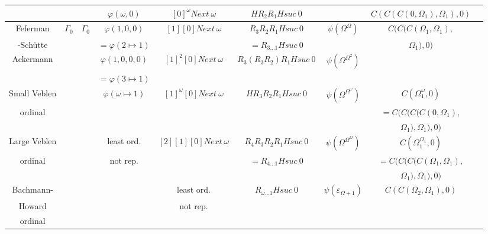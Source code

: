 \documentclass[10pt]{article}
\begin{document}
\begin{tabular}{|c|c|c|c|c|c|c|c|c|}
		&			&			& \(\varphi(\omega,0)\)		& \([0]^\omega Next\ \omega\) & \(H R_2 R_1 H suc\ 0\)&					& \(C(C(C(0,\Omega_1),\Omega_1),0)\) \\ \hline
Feferman	& \(\Gamma_0\)		
								& \(\Gamma_0\)			& \(\varphi(1,0,0)\)		& \([1] [0] Next\ \omega\)	& \(R_3 R_2 R_1 H suc\ 0\) & \(\psi(\Omega^\Omega)\)		& \(C(C(C(\Omega_1,\Omega_1),\) \\ 
-Schütte	&			&				& \(=\varphi(2 \mapsto 1)\)	&				& \(= R_{3 \ldots 1} H suc\ 0\) & 					& \(\Omega_1),0)\)		\\ \hline
Ackermann	&			&				& \(\varphi(1,0,0,0)\)		& \([1]^2 [0] Next\ \omega\) & \(R_3 (R_3 R_2) R_1 H suc\ 0\) & \(\psi(\Omega^{\Omega^2})\)		&				\\ 
		&			&				& \(=\varphi(3 \mapsto 1)\)	&				&			&					&				\\ \hline
Small Veblen	&			&				& \(\varphi(\omega \mapsto 1)\)	& \([1]^\omega [0] Next\ \omega\) & \(H R_3 R_2 R_1 H suc\ 0\) & \(\psi(\Omega^{\Omega^\omega})\)	& \(C(\Omega_1^\omega,0)\)	\\
ordinal		&			&				&				&				&			&					& \(=C(C(C(C(0,\Omega_1), \)	\\ 
		&			&				&				&				&			&					& \(\Omega_1),\Omega_1),0)\)	\\ \hline
Large Veblen	&			&				& least ord.	 	 	& \([2] [1] [0] Next\ \omega\)	& \(R_4 R_3 R_2 R_1 H suc\ 0\) & \(\psi(\Omega^{\Omega^\Omega})\)	& \(C(\Omega_1^{\Omega_1},0)\)	\\
ordinal		&			&				& not rep.			&				& \(= R_{4 \ldots 1} H suc\ 0\) &					& \(=C(C(C(C(\Omega_1,\Omega_1),\) \\ 
		&			&				&				&				&			&					& \( \Omega_1),\Omega_1),0) \)	\\ \hline
Bachmann-	&			&				&				& least ord.			& \(R_{\omega \ldots 1} H suc\ 0\) & \(\psi(\varepsilon_{\Omega+1})\)	& \(C(C(\Omega_2,\Omega_1),0)\)	\\
Howard		&			&				&				& not rep.			&			&					&				\\ 
ordinal		&			&				&				&				&			&					&				\\ \hline
  
\end{tabular}
\end{document}
